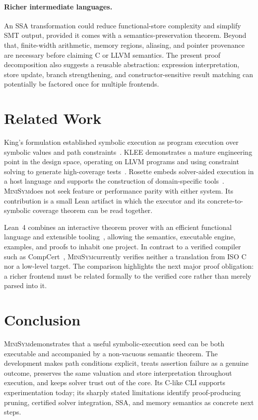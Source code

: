 \documentclass[10pt,twocolumn]{article}
\newcommand{\tool}{\textsc{MiniSym}}
\begin{document}
\paragraph{Richer intermediate languages.}
An SSA transformation could reduce functional-store complexity and simplify SMT
output, provided it comes with a semantics-preservation theorem.  Beyond that,
finite-width arithmetic, memory regions, aliasing, and pointer provenance are
necessary before claiming C or LLVM semantics.  The present proof decomposition
also suggests a reusable abstraction: expression interpretation, store update,
branch strengthening, and constructor-sensitive result matching can potentially
be factored once for multiple frontends.

\section{Related Work}

King's formulation established symbolic execution as program execution over
symbolic values and path constraints~\cite{king1976}.  KLEE demonstrates a mature
engineering point in the design space, operating on LLVM programs and using
constraint solving to generate high-coverage tests~\cite{klee}.  Rosette embeds
solver-aided execution in a host language and supports the construction of
domain-specific tools~\cite{rosette}.  \tool does not seek feature or performance
parity with either system.  Its contribution is a small Lean artifact in which
the executor and its concrete-to-symbolic coverage theorem can be read together.

Lean~4 combines an interactive theorem prover with an efficient functional
language and extensible tooling~\cite{lean4}, allowing the semantics, executable
engine, examples, and proofs to inhabit one project.  In contrast to a verified
compiler such as CompCert~\cite{compcert}, \tool currently verifies neither a
translation from ISO C nor a low-level target.  The comparison highlights the
next major proof obligation: a richer frontend must be related formally to the
verified core rather than merely parsed into it.

\section{Conclusion}

\tool demonstrates that a useful symbolic-execution seed can be both executable
and accompanied by a non-vacuous semantic theorem.  The development makes path
conditions explicit, treats assertion failure as a genuine outcome, preserves
the same valuation and store interpretation throughout execution, and keeps
solver trust out of the core.  Its C-like CLI supports experimentation today;
its sharply stated limitations identify proof-producing pruning, certified solver
integration, SSA, and memory semantics as concrete next steps.
\end{document}
